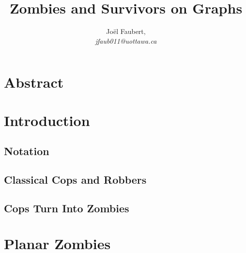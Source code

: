 \documentclass[letterpaper, 12pt]{report}
\title{Zombies and Survivors on Graphs}
\author{Jo\"el Faubert, \\ \textit{jfaub011@uottawa.ca}}
\theoremstyle{definition}
\begin{document}

\hypersetup{pageanchor=false}


\hypersetup{pageanchor=true}


\chapter*{Abstract}


\tableofcontents

\cleardoublepage{}

\chapter{Introduction}



\section{Notation}


\section{Classical Cops and Robbers}


\section{Cops Turn Into Zombies}


\chapter{Planar Zombies \label{chapter planar zombies}}



%

%
\end{document}
